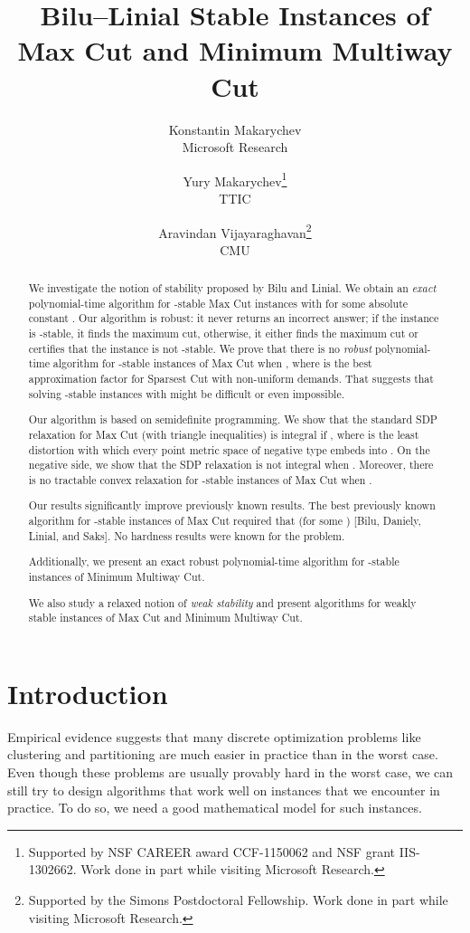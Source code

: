 \documentclass[twoside,leqno,twocolumn]{article}
\title{Bilu--Linial Stable Instances of Max Cut and Minimum Multiway Cut}
\author{Konstantin Makarychev\\Microsoft Research
\and Yury Makarychev\thanks{Supported by NSF CAREER award CCF-1150062 and NSF grant IIS-1302662. 
Work done in part while visiting Microsoft Research.}\\TTIC
\and Aravindan Vijayaraghavan\thanks{Supported by the Simons Postdoctoral Fellowship. Work done in part while visiting Microsoft Research.}\\CMU}
\date{}
\begin{document}
\maketitle
\begin{abstract}
We investigate the notion of stability proposed by Bilu and Linial. We obtain an \textit{exact} polynomial-time  algorithm for
-stable Max Cut instances with  for some absolute constant . 
Our algorithm is robust: it never returns an incorrect answer;
if the instance is -stable, it finds the maximum cut, otherwise, it either finds the maximum cut or certifies that the instance is not -stable. We prove that there is no \textit{robust} polynomial-time algorithm for -stable instances of Max Cut
when , where  is the best approximation factor for Sparsest Cut with non-uniform demands. That suggests that solving -stable instances with  might be difficult or even impossible.

Our algorithm is based on semidefinite programming. We show that the standard SDP relaxation for Max Cut 
(with  triangle inequalities) is integral if 
, where  is the least distortion with which every  point metric space of negative type embeds into . On the negative side, we show that the SDP relaxation is not integral when .
Moreover, there is no tractable convex relaxation for -stable instances of Max Cut
when . 

Our results significantly improve previously known results. The best previously known algorithm for -stable instances of Max Cut 
required that  (for some )  [Bilu, Daniely, Linial, and Saks]. No hardness results were known for the problem.

Additionally, we present an exact robust polynomial-time algorithm for -stable instances of Minimum Multiway Cut.

We also study a relaxed notion of \textit{weak stability} and present algorithms for weakly stable instances of Max Cut and Minimum Multiway Cut.
\end{abstract}

\ifSODA\else
\setcounter{page}{0}
\thispagestyle{empty} \pagebreak
\fi


\section{Introduction} \label{sec:intro}
Empirical evidence suggests that many discrete optimization problems like clustering and partitioning
are much easier in practice than in the worst case. Even though these problems are usually provably 
hard in the worst case, we can still try to design algorithms that 
work well on instances that we encounter in practice. To do so, we need a good mathematical model 
for such instances. 
\end{document}
